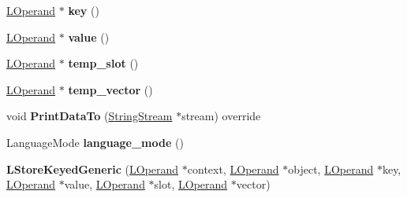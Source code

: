 \begin{DoxyCompactItemize}
\item 
\hyperlink{classv8_1_1internal_1_1_l_operand}{L\+Operand} $\ast$ {\bfseries key} ()\hypertarget{classv8_1_1internal_1_1_l_store_keyed_generic_a8e5ab828ddbab917cc744e7c6022259d}{}\label{classv8_1_1internal_1_1_l_store_keyed_generic_a8e5ab828ddbab917cc744e7c6022259d}

\item 
\hyperlink{classv8_1_1internal_1_1_l_operand}{L\+Operand} $\ast$ {\bfseries value} ()\hypertarget{classv8_1_1internal_1_1_l_store_keyed_generic_ae0648fd1acbfca9be9ecd39a179ebb13}{}\label{classv8_1_1internal_1_1_l_store_keyed_generic_ae0648fd1acbfca9be9ecd39a179ebb13}

\item 
\hyperlink{classv8_1_1internal_1_1_l_operand}{L\+Operand} $\ast$ {\bfseries temp\+\_\+slot} ()\hypertarget{classv8_1_1internal_1_1_l_store_keyed_generic_a2badce4286c0f26664dbddd0e2b29846}{}\label{classv8_1_1internal_1_1_l_store_keyed_generic_a2badce4286c0f26664dbddd0e2b29846}

\item 
\hyperlink{classv8_1_1internal_1_1_l_operand}{L\+Operand} $\ast$ {\bfseries temp\+\_\+vector} ()\hypertarget{classv8_1_1internal_1_1_l_store_keyed_generic_a8e332b61e68443ed2a912b79cbf01438}{}\label{classv8_1_1internal_1_1_l_store_keyed_generic_a8e332b61e68443ed2a912b79cbf01438}

\item 
void {\bfseries Print\+Data\+To} (\hyperlink{classv8_1_1internal_1_1_string_stream}{String\+Stream} $\ast$stream) override\hypertarget{classv8_1_1internal_1_1_l_store_keyed_generic_ab0d8e8441ce3f1b71da8ce0ccf807df8}{}\label{classv8_1_1internal_1_1_l_store_keyed_generic_ab0d8e8441ce3f1b71da8ce0ccf807df8}

\item 
Language\+Mode {\bfseries language\+\_\+mode} ()\hypertarget{classv8_1_1internal_1_1_l_store_keyed_generic_a279b2804fdca1b8181ce7a4b2e7a0d88}{}\label{classv8_1_1internal_1_1_l_store_keyed_generic_a279b2804fdca1b8181ce7a4b2e7a0d88}

\item 
{\bfseries L\+Store\+Keyed\+Generic} (\hyperlink{classv8_1_1internal_1_1_l_operand}{L\+Operand} $\ast$context, \hyperlink{classv8_1_1internal_1_1_l_operand}{L\+Operand} $\ast$object, \hyperlink{classv8_1_1internal_1_1_l_operand}{L\+Operand} $\ast$key, \hyperlink{classv8_1_1internal_1_1_l_operand}{L\+Operand} $\ast$value, \hyperlink{classv8_1_1internal_1_1_l_operand}{L\+Operand} $\ast$slot, \hyperlink{classv8_1_1internal_1_1_l_operand}{L\+Operand} $\ast$vector)\hypertarget{classv8_1_1internal_1_1_l_store_keyed_generic_af091880976ae47ab5668f689b739343e}{}\label{classv8_1_1internal_1_1_l_store_keyed_generic_af091880976ae47ab5668f689b739343e}


\end{DoxyCompactItemize}
